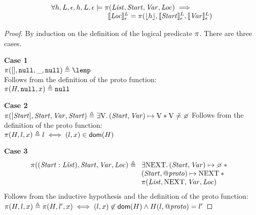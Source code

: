 \documentclass{article}
\begin{document}
\begin{lemma}
        \label{lemma:protosoundness}
        \[ \begin{array}{l}
                \forall h,L,\epsilon \mathpunct{.} h,L,\epsilon\models \pi({\mathit{List}},{\mathit{Start}},{\mathit{Var}},{\mathit{Loc}}) \implies \\
                \qquad\qquad\qquad\qquad \llbracket {\ensuremath{\mathit{Loc}}} \rrbracket_{\epsilon}^L = \pi(\lfloor h\rfloor,\llbracket {\ensuremath{\mathit{Start}}} \rrbracket_{\epsilon}^L,\llbracket {\ensuremath{\mathit{Var}}} \rrbracket_{\epsilon}^L)
        \end{array}\]
        \begin{proof}
                By induction on the definition of the logical predicate $\pi$. There are three cases.

                \textbf{Case 1}\\
                $\proto([],\nil,\_,\nil) \triangleq \lemp$\\
                Follows from the definition of the proto function:\\
                $\pi(H,\mbox{\texttt{{\upshape null}}},x)\triangleq\mbox{\texttt{{\upshape null}}}$

                \textbf{Case 2}\\
                $\proto([\E{Start}],\E{Start},\E{Var},\E{Start}) \triangleq \exists \LVAL\st (\E{Start},\E{Var})\pointsto\LVAL \sep \LVAL\not\doteq\none $
                Follows from the definition of the proto function:\\
                $\pi(H,l,x) \triangleq l   \iff (l,x)\in\mathsf{dom}(H)$

                \textbf{Case 3}\\
                \[\proto((\E{Start}:\E{List}),\E{Start},\E{Var},\E{Loc}) \triangleq \begin{array}[t]{l}
                        \exists \V{NEXT}\st (\E{Start},\E{Var}) \pointsto\none \sep{}\\
                        (\E{Start},\protop)\pointsto\V{NEXT} \sep{}\\
                        \proto(\E{List},\V{NEXT},\E{Var},\E{Loc})
                \end{array}\]
                Follows from the inductive hypothesis and the definition of the proto function:\\
                $\pi(H,l,x)\triangleq\pi(H,l',x) \iff (l,x)\not\in\mathsf{dom}(H) \land H(l,\mathit{@proto}) = l'$
        \end{proof}
\end{lemma}
\end{document}
